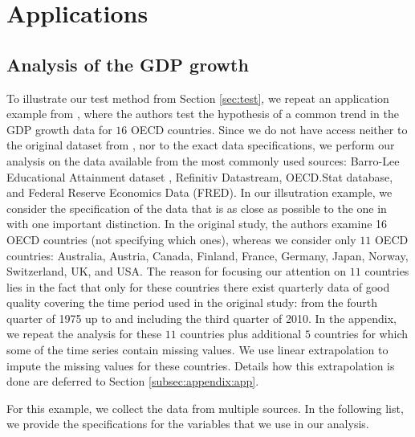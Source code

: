 \documentclass[a4paper,12pt]{article}
\begin{document}
{\color{red}
\section{Applications}\label{sec:app}
\subsection{Analysis of the GDP growth}\label{subsec:app:gdp}


To illustrate our test method from Section \ref{sec:test}, we repeat an application example from \cite{Zhang2012}, where the authors test the hypothesis of a common trend in the GDP growth data for $16$ OECD countries. Since we do not have access neither to the original dataset from \cite{Zhang2012}, nor to the exact data specifications, we perform our analysis on the data available from the most commonly used sources: Barro-Lee Educational Attainment dataset \citep*{Barro2013}, Refinitiv Datastream, OECD.Stat database, and Federal Reserve Economics Data (FRED). In our illsutration example, we consider the specification of the data that is as close as possible to the one in \linebreak \cite{Zhang2012} with one important distinction. In the original study, the authors examine 16 OECD countries (not specifying which ones), whereas we consider only $11$ OECD countries: Australia, Austria, Canada, Finland, France, Germany, Japan, Norway, Switzerland, UK, and USA. The reason for focusing our attention on $11$ countries lies in the fact that only for these countries there exist quarterly data of good quality covering the time period used in the original study: from the fourth quarter of 1975 up to and including the third quarter of 2010. In the appendix, we repeat the analysis for these $11$ countries plus additional $5$ countries for which some of the time series contain missing values. We use linear extrapolation to impute the missing values for these countries. Details how this extrapolation is done are deferred to Section \ref{subsec:appendix:app}.

For this example, we collect the data from multiple sources. In the following list, we provide the specifications for the variables that we use in our analysis.

}
\end{document}
